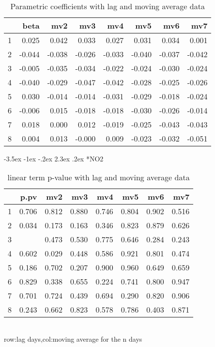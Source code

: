 \documentclass[a4paper, 12pt]{article}
\makeatletter
\def\large{\fontsize{14}{20}\selectfont}
\renewcommand\subsection{\@startsection {subsection}{1}{\z@}%
                                   {-3.5ex \@plus -1ex \@minus -.2ex}%
                                   {2.3ex \@plus.2ex}%
                                   {\centering\normalfont\large\bfseries}}
\makeatother
\begin{document}
\begin{table}[h]
\centering
\caption{Parametric coefficients with lag and moving average data}
\begin{tabular}{rrrrrrrr}
  \hline
 & beta & mv2 & mv3 & mv4 & mv5 & mv6 & mv7 \\
  \hline
1 & 0.025 & 0.042 & 0.033 & 0.027 & 0.031 & 0.034 & 0.001 \\
  2 & -0.044 & -0.038 & -0.026 & -0.033 & -0.040 & -0.037 & -0.042 \\
  3 & -0.005 & -0.035 & -0.034 & -0.022 & -0.024 & -0.030 & -0.024 \\
  4 & -0.040 & -0.029 & -0.047 & -0.042 & -0.028 & -0.025 & -0.026 \\
  5 & 0.030 & -0.014 & -0.014 & -0.031 & -0.029 & -0.018 & -0.024 \\
  6 & -0.006 & 0.015 & -0.018 & -0.018 & -0.030 & -0.026 & -0.014 \\
  7 & 0.018 & 0.000 & 0.012 & -0.019 & -0.025 & -0.043 & -0.043 \\
  8 & 0.004 & 0.013 & -0.000 & 0.009 & -0.023 & -0.032 & -0.051 \\
   \hline
\end{tabular}
\end{table}
\clearpage
\subsection*{NO2}
\begin{table}[h]
\centering
\caption{linear term p-value with lag and moving average data}
\begin{tabular}{rrrrrrrr}
  \hline
 & p.pv & mv2 & mv3 & mv4 & mv5 & mv6 & mv7 \\
  \hline
1 & 0.706 & 0.812 & 0.880 & 0.746 & 0.804 & 0.902 & 0.516 \\
  2 & 0.034 & 0.173 & 0.163 & 0.346 & 0.823 & 0.879 & 0.626 \\
  3 & \color{red}{0.003} & 0.473 & 0.530 & 0.775 & 0.646 & 0.284 & 0.243 \\
  4 & 0.602 & 0.029 & 0.448 & 0.586 & 0.921 & 0.801 & 0.474 \\
  5 & 0.186 & 0.702 & 0.207 & 0.900 & 0.960 & 0.649 & 0.659 \\
  6 & 0.829 & 0.338 & 0.655 & 0.224 & 0.741 & 0.800 & 0.947 \\
  7 & 0.701 & 0.724 & 0.439 & 0.694 & 0.290 & 0.820 & 0.906 \\
  8 & 0.243 & 0.662 & 0.823 & 0.578 & 0.786 & 0.403 & 0.871 \\
   \hline
\end{tabular}
\\row:lag days,col:moving average for the n days
\end{table}
\end{document}
